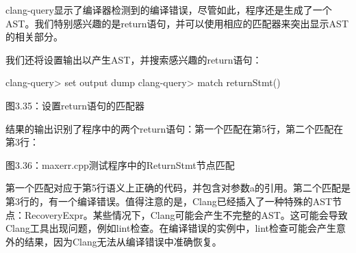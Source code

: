 clang-query显示了编译器检测到的编译错误，尽管如此，程序还是生成了一个AST。我们特别感兴趣的是return语句，并可以使用相应的匹配器来突出显示AST的相关部分。

我们还将设置输出以产生AST，并搜索感兴趣的return语句：

\begin{shell}
clang-query> set output dump
clang-query> match returnStmt()
\end{shell}

\begin{center}
图3.35：设置return语句的匹配器
\end{center}

结果的输出识别了程序中的两个return语句：第一个匹配在第5行，第二个匹配在第3行：


\begin{center}
图3.36：maxerr.cpp测试程序中的ReturnStmt节点匹配
\end{center}

第一个匹配对应于第5行语义上正确的代码，并包含对参数a的引用。第二个匹配是第3行的，有一个编译错误。值得注意的是，Clang已经插入了一种特殊的AST节点：RecoveryExpr。某些情况下，Clang可能会产生不完整的AST。这可能会导致Clang工具出现问题，例如lint检查。在编译错误的实例中，lint检查可能会产生意外的结果，因为Clang无法从编译错误中准确恢复。




















































































